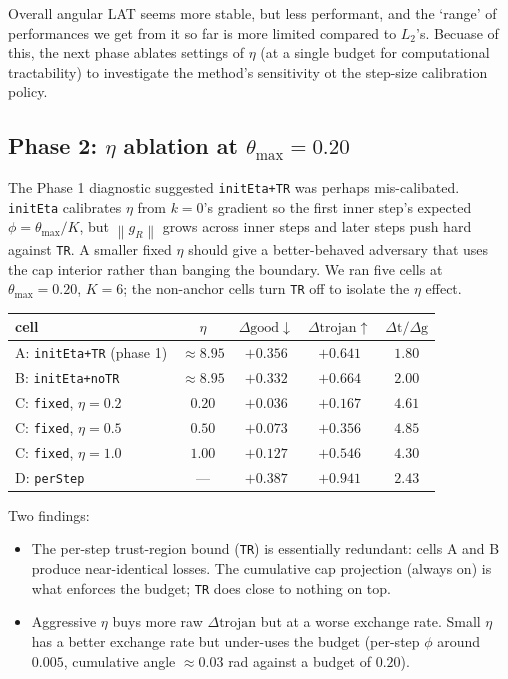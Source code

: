 \documentclass[11pt]{article}
\newcommand{\thmax}{\theta_{\max}}
\newcommand{\norm}[1]{\left\lVert#1\right\rVert}
\begin{document}
Overall angular LAT seems more stable, but less performant, and the `range' of performances we get from it so far is more limited compared to $L_2$'s. 
Becuase of this, the next phase ablates settings of $\eta$ (at a single budget for computational tractability) to investigate the method's sensitivity ot the step-size calibration policy.  


\subsection{Phase 2: $\eta$ ablation at $\thmax{=}0.20$}

The Phase 1 diagnostic suggested \texttt{initEta+TR} was perhaps mis-calibated. \texttt{initEta} calibrates $\eta$ from $k{=}0$'s gradient so the first inner step's expected $\phi = \thmax/K$, but $\norm{g_R}$ grows across inner steps and later steps push hard against \texttt{TR}. A smaller fixed $\eta$ should give a better-behaved adversary that uses the cap interior rather than banging the boundary. We ran five cells at $\thmax{=}0.20$, $K{=}6$; the non-anchor cells turn \texttt{TR} off to isolate the $\eta$ effect.

\begin{table}[h]
\centering\small
\begin{tabular}{lcccc}
\toprule
\textbf{cell} & $\eta$ & $\Delta\text{good}\downarrow$ & $\Delta\text{trojan}\uparrow$ & $\Delta\text{t}/\Delta\text{g}$ \\
\midrule
A: \texttt{initEta+TR} (phase 1)       & $\approx 8.95$ & $+0.356$ & $+0.641$ & $1.80$ \\
B: \texttt{initEta+noTR}               & $\approx 8.95$ & $+0.332$ & $+0.664$ & $2.00$ \\
C: \texttt{fixed}, $\eta{=}0.2$        & $0.20$ & $+0.036$ & $+0.167$ & $\mathbf{4.61}$ \\
C: \texttt{fixed}, $\eta{=}0.5$        & $0.50$ & $+0.073$ & $+0.356$ & $\mathbf{4.85}$ \\
C: \texttt{fixed}, $\eta{=}1.0$        & $1.00$ & $+0.127$ & $+0.546$ & $\mathbf{4.30}$ \\
D: \texttt{perStep}           & ---            & $+0.387$ & $+0.941$ & $2.43$ \\
\bottomrule
\end{tabular}
\end{table}

Two findings:
\begin{itemize}[leftmargin=*]
\item The per-step trust-region bound (\texttt{TR}) is essentially redundant: cells A and B produce near-identical losses. The cumulative cap projection (always on) is what enforces the budget; \texttt{TR} does close to nothing on top.
\item Aggressive $\eta$ buys more raw $\Delta\text{trojan}$ but at a worse exchange rate. Small $\eta$ has a better exchange rate but under-uses the budget (per-step $\phi$ around $0.005$, cumulative angle $\approx 0.03$ rad against a budget of $0.20$).
\end{itemize}
\end{document}
